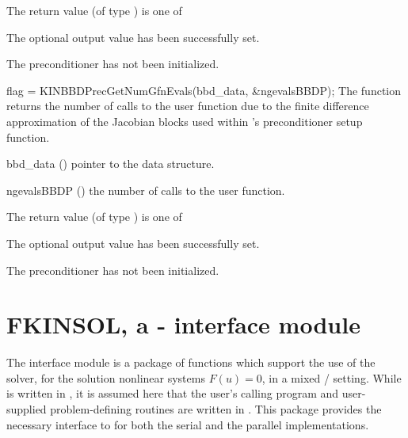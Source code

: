 {
  The return value  (of type ) is one of
  \begin{args}
  \item[\Id{KIN\_SUCCESS}] 
    The optional output value has been successfully set.
  \item[\Id{KIN\_PDATA\_NULL}]
    The {\kinbbdpre} preconditioner has not been initialized.
  \end{args}
}
{}
{
  flag = KINBBDPrecGetNumGfnEvals(bbd\_data, \&ngevalsBBDP);
}
{
  The function  returns the
  number of calls to the user  function due to the 
  finite difference approximation of the Jacobian blocks used within
  {\kinbbdpre}'s preconditioner setup function.
}
{
  \begin{args}[ngevalsBBDP]
  \item[bbd\_data] ()
    pointer to the {\kinbbdpre} data structure.
  \item[ngevalsBBDP] ()
    the number of calls to the user  function.
  \end{args}
}
{
  The return value  (of type ) is one of
  \begin{args}
  \item[\Id{KIN\_SUCCESS}] 
    The optional output value has been successfully set.
  \item[\Id{KIN\_PDATA\_NULL}]
    The {\kinbbdpre} preconditioner has not been initialized.
  \end{args}
}
{}


\section{FKINSOL, a {\F}-{\C} interface module}\label{ss:fcmix}

The {\fkinsol} interface module is a package of {\C} functions which support
the use of the {\kinsol} solver, for the solution nonlinear systems
$F(u)=0$, in a mixed {\F}/{\C} setting.  While {\kinsol} is written
in {\C}, it is assumed here that the user's calling program and
user-supplied problem-defining routines are written in {\F}.
This package provides the necessary interface to {\kinsol} for both the
serial and the parallel {\nvector} implementations.

